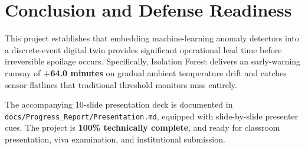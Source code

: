 \documentclass[11pt,a4paper,oneside]{article}
\begin{document}
\section{Conclusion and Defense Readiness}

This project establishes that embedding machine-learning anomaly detectors into a discrete-event digital twin provides significant operational lead time before irreversible spoilage occurs. Specifically, Isolation Forest delivers an early-warning runway of \textbf{+64.0 minutes} on gradual ambient temperature drift and catches sensor flatlines that traditional threshold monitors miss entirely.

The accompanying 10-slide presentation deck is documented in \texttt{docs/Progress\_Report/Presentation.md}, equipped with slide-by-slide presenter cues. The project is \textbf{100\% technically complete}, and ready for classroom presentation, viva examination, and institutional submission.

\newpage
\printbibliography[heading=bibintoc, title={References \& Recent Benchmark Literature}]
\end{document}
